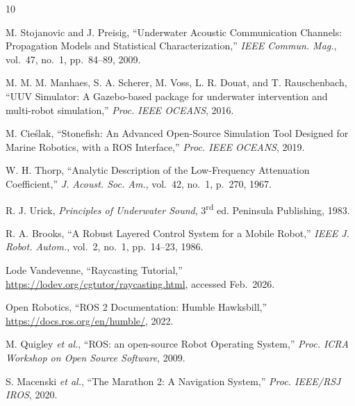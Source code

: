 \documentclass[10pt,twocolumn,letterpaper]{article}
\begin{document}
\begin{thebibliography}{10}

M. Stojanovic and J. Preisig,
``Underwater Acoustic Communication Channels: Propagation Models and Statistical Characterization,''
\textit{IEEE Commun. Mag.}, vol.~47, no.~1, pp.~84--89, 2009.

M. M. M. Manhaes, S. A. Scherer, M. Voss, L. R. Douat, and T. Rauschenbach,
``UUV Simulator: A Gazebo-based package for underwater intervention and multi-robot simulation,''
\textit{Proc. IEEE OCEANS}, 2016.

M. Cie\'{s}lak,
``Stonefish: An Advanced Open-Source Simulation Tool Designed for Marine Robotics, with a ROS Interface,''
\textit{Proc. IEEE OCEANS}, 2019.

W. H. Thorp,
``Analytic Description of the Low-Frequency Attenuation Coefficient,''
\textit{J. Acoust. Soc. Am.}, vol.~42, no.~1, p.~270, 1967.

R. J. Urick,
\textit{Principles of Underwater Sound}, 3\textsuperscript{rd} ed.
Peninsula Publishing, 1983.

R. A. Brooks,
``A Robust Layered Control System for a Mobile Robot,''
\textit{IEEE J. Robot. Autom.}, vol.~2, no.~1, pp.~14--23, 1986.

Lode Vandevenne,
``Raycasting Tutorial,''
\url{https://lodev.org/cgtutor/raycasting.html}, accessed Feb.~2026.

Open Robotics,
``ROS 2 Documentation: Humble Hawksbill,''
\url{https://docs.ros.org/en/humble/}, 2022.

M. Quigley \textit{et al.},
``ROS: an open-source Robot Operating System,''
\textit{Proc. ICRA Workshop on Open Source Software}, 2009.

S. Macenski \textit{et al.},
``The Marathon 2: A Navigation System,''
\textit{Proc. IEEE/RSJ IROS}, 2020.

\end{thebibliography}
\end{document}
